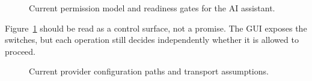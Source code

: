 \begin{figure}[htbp]
\centering
\caption{Current permission model and readiness gates for the AI assistant.}
\label{fig:ai-permission-model}
\end{figure}

Figure~\ref{fig:ai-permission-model} should be read as a control surface, not a promise. The GUI exposes the switches, but each operation still decides independently whether it is allowed to proceed.

\begin{figure}[htbp]
\centering
\caption{Current provider configuration paths and transport assumptions.}
\label{fig:ai-provider-configuration}
\end{figure}

